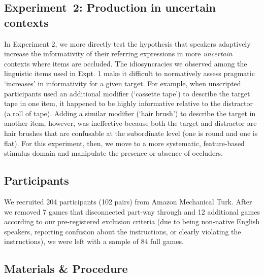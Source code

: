 \documentclass[manuscript]{stjour}
\begin{document}
\subsection{Experiment~2: Production in uncertain contexts}
\label{sec:Exp2}

In Experiment 2, we more directly test the hypothesis that speakers adaptively increase the informativity of their referring expressions in more \emph{uncertain} contexts where items are occluded. The idiosyncracies we observed among the linguistic items used in Expt. 1 make it difficult to normatively assess pragmatic `increases' in informativity for a given target. For example, when unscripted participants used an additional modifier (`cassette tape') to describe the target tape in one item, it happened to be highly informative relative to the distractor (a roll of tape). Adding a similar modifier (`hair brush') to describe the target in another item, however, was ineffective because both the target and distractor are hair brushes that are confusable at the subordinate level (one is round and one is flat). For this experiment, then, we move to a more systematic, feature-based stimulus domain and manipulate the presence or absence of occluders.

\subsection{Participants}

We recruited 204 participants (102 pairs) from Amazon Mechanical Turk. After we removed 7 games that disconnected part-way through and 12 additional games according to our pre-registered exclusion criteria (due to being non-native English speakers, reporting confusion about the instructions, or clearly violating the instructions), we were left with a sample of 84 full games. 

\subsection{Materials \& Procedure}
\end{document}

